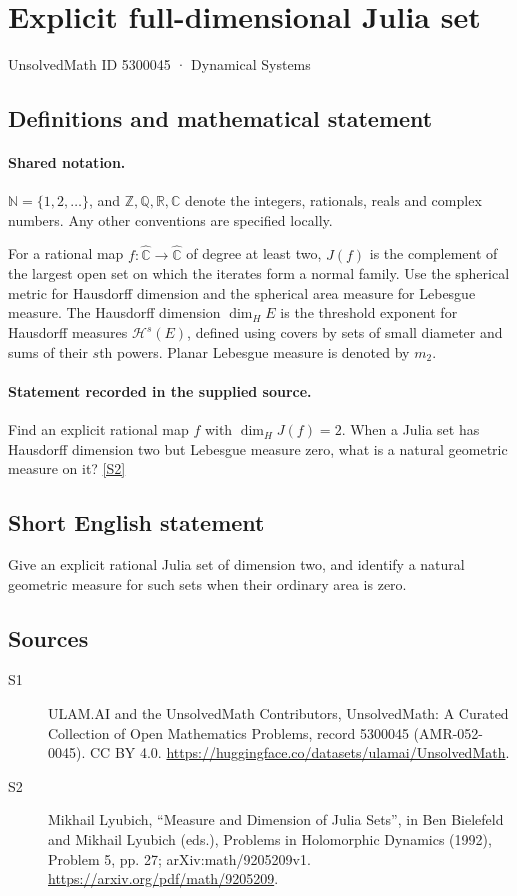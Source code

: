 \documentclass[11pt]{article}
\newcommand{\sref}[2]{\hyperlink{source:#1:#2}{[S#2]}}
\begin{document}
\setcounter{section}{5300044}
\section{Explicit full-dimensional Julia set}\label{5300045}
{\small\sffamily UnsolvedMath ID 5300045 · Dynamical Systems}
\subsection{Definitions and mathematical statement}

\paragraph{Shared notation.}$\mathbb N=\{1,2,\ldots\}$, and $\mathbb Z,\mathbb Q,\mathbb R,\mathbb C$ denote the integers, rationals, reals and complex numbers. Any other conventions are specified locally.


For a rational map $f:\widehat{\mathbb C}\to\widehat{\mathbb C}$ of degree at least two, $J(f)$ is the complement of the largest open set on which the iterates form a normal family. Use the spherical metric for Hausdorff dimension and the spherical area measure for Lebesgue measure. The Hausdorff dimension $\dim_H E$ is the threshold exponent for Hausdorff measures $\mathcal H^s(E)$, defined using covers by sets of small diameter and sums of their $s$th powers. Planar Lebesgue measure is denoted by $m_2$.
\paragraph{Statement recorded in the supplied source.}
Find an explicit rational map $f$ with $\dim_HJ(f)=2$. When a Julia set has Hausdorff dimension two but Lebesgue measure zero, what is a natural geometric measure on it? \sref{5300045}{2}
\subsection{Short English statement}
Give an explicit rational Julia set of dimension two, and identify a natural geometric measure for such sets when their ordinary area is zero.
\subsection{Sources}
\begin{description}
\item[\hypertarget{source:5300045:1}{S1}] ULAM.AI and the UnsolvedMath Contributors, UnsolvedMath: A Curated Collection of Open Mathematics Problems, record 5300045 (AMR-052-0045). CC BY 4.0. \url{https://huggingface.co/datasets/ulamai/UnsolvedMath}.
\item[\hypertarget{source:5300045:2}{S2}] Mikhail Lyubich, ``Measure and Dimension of Julia Sets'', in Ben Bielefeld and Mikhail Lyubich (eds.), Problems in Holomorphic Dynamics (1992), Problem 5, pp. 27; arXiv:math/9205209v1. \url{https://arxiv.org/pdf/math/9205209}.
\end{description}
\label{end:5300045}
\end{document}
